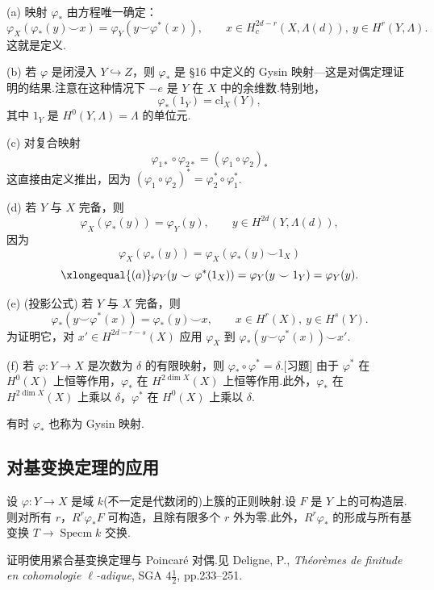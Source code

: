 \begin{remark}\label{rem:24.2}
(a) 映射 $\varphi_{*}$ 由方程唯一确定：
\[
\varphi_X(\varphi_{*}(y) \smile x) = \varphi_Y(y \smile \varphi^{*}(x)), \qquad x \in H^{2d-r}_{c}(X, \Lambda(d)), \ y \in H^{r}(Y, \Lambda).
\]
这就是定义.

(b) 若 $\varphi$ 是闭浸入 $Y \hookrightarrow Z$，则 $\varphi_{*}$ 是 \S 16 中定义的 Gysin 映射---这是对偶定理证明的结果.注意在这种情况下 $-e$ 是 $Y$ 在 $X$ 中的余维数.特别地，
\[
\varphi_{*}(1_Y) = \mathrm{cl}_X(Y),
\]
其中 $1_Y$ 是 $H^{0}(Y, \Lambda) = \Lambda$ 的单位元.

(c) 对复合映射
\[
\varphi_{1*} \circ \varphi_{2*} = (\varphi_1 \circ \varphi_2)_{*}
\]
这直接由定义推出，因为 $(\varphi_1 \circ \varphi_2)^{*} = \varphi^{*}_2 \circ \varphi^{*}_1$.

(d) 若 $Y$ 与 $X$ 完备，则
\[
\varphi_X(\varphi_{*}(y)) = \varphi_Y(y), \qquad y \in H^{2d}(Y, \Lambda(d)),
\]
因为
\[
\varphi_X(\varphi_{*}(y)) = \varphi_X(\varphi_{*}(y) \smile 1_X)
\]
\[
\xlongequal{(a)} \varphi_Y(y \smile \varphi^{*}(1_X)) = \varphi_Y(y \smile 1_Y) = \varphi_Y(y).
\]

(e) (投影公式) 若 $Y$ 与 $X$ 完备，则
\[
\varphi_{*}(y \smile \varphi^{*}(x)) = \varphi_{*}(y) \smile x, \qquad x \in H^{r}(X), \ y \in H^{s}(Y).
\]
为证明它，对 $x' \in H^{2d-r-s}(X)$ 应用 $\varphi_X$ 到 $\varphi_{*}(y \smile \varphi^{*}(x)) \smile x'$.

(f) 若 $\varphi \colon Y \to X$ 是次数为 $\delta$ 的有限映射，则 $\varphi_{*} \circ \varphi^{*} = \delta$.[习题] 由于 $\varphi^{*}$ 在 $H^{0}(X)$ 上恒等作用，$\varphi_{*}$ 在 $H^{2\dim X}(X)$ 上恒等作用.此外，$\varphi_{*}$ 在 $H^{2\dim X}(X)$ 上乘以 $\delta$，$\varphi^{*}$ 在 $H^{0}(X)$ 上乘以 $\delta$.

有时 $\varphi_{*}$ 也称为 Gysin 映射.
\end{remark}

\subsection*{对基变换定理的应用}

\begin{theorem}\label{thm:24.3}
设 $\varphi \colon Y \to X$ 是域 $k$(不一定是代数闭的)上簇的正则映射.设 $F$ 是 $Y$ 上的可构造层.则对所有 $r$，$R^{r}\varphi_{*}F$ 可构造，且除有限多个 $r$ 外为零.此外，$R^{r}\varphi_{*}$ 的形成与所有基变换 $T \to \operatorname{Specm} k$ 交换.
\end{theorem}

证明使用紧合基变换定理与 Poincar\'e 对偶.见 Deligne, P., \emph{Th\'eor\`emes de finitude en cohomologie $\ell$-adique}, SGA $4\frac{1}{2}$, pp.233--251.

